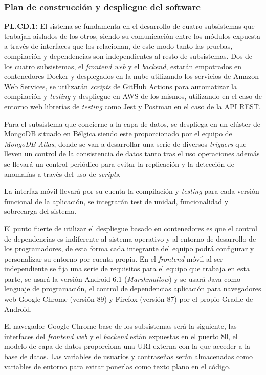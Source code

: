 \documentclass{article}
\begin{document}
\pagebreak
\subsubsection{Plan de construcción y despliegue del software}
 
\textbf{PL.CD.1: }
El sistema se fundamenta en el desarrollo de cuatro subsistemas que trabajan aislados de los otros, siendo su comunicación entre los módulos expuesta a través de interfaces que los relacionan, de este modo tanto las pruebas, compilación y dependencias son independientes al resto de subsistemas.
Dos de los cuatro subsistemas, el \textit{frontend web} y el \textit{backend}, estarán empotrados en contenedores Docker y desplegados en la nube utilizando los servicios de Amazon Web Services, se utilizarán \textit{scripts} de GitHub Actions para automatizar la compilación y \textit{testing} y despliegue en AWS de los mismos, utilizando en el caso de entorno web librerías de \textit{testing} como Jest y Postman en el caso de la API REST.
 
Para el subsistema que concierne a la capa de datos, se despliega en un clúster de MongoDB situado en Bélgica siendo este proporcionado por el equipo de \textit{MongoDB Atlas}, donde se van a desarrollar una serie de diversos \textit{triggers} que lleven un control de la consistencia de datos tanto tras el uso operaciones además se llevará un control periódico para evitar la replicación y la detección de anomalías a través del uso de \textit{scripts}.
 
La interfaz móvil llevará por su cuenta la compilación y \textit{testing} para cada versión funcional de la aplicación, se integrarán test de unidad, funcionalidad y sobrecarga del sistema.
 
El punto fuerte de utilizar el despliegue basado en contenedores es que el control de dependencias es indiferente al sistema operativo y al entorno de desarrollo de los programadores, de esta forma cada integrante del equipo podrá configurar y personalizar su entorno por cuenta propia. En el \textit{frontend} móvil al ser independiente se fija una serie de requisitos para el equipo que trabaja en esta parte, se usará la versión Android 6.1 (\textit{Marshmallow}) y se usará Java como lenguaje de programación, el control de dependencias aplicación para navegadores web Google Chrome (versión 89) y Firefox (versión 87) por el propio Gradle de Android.
 
El navegador Google Chrome  base de los subsistemas será la siguiente, las interfaces del \textit{frontend web} y el \textit{backend} están expuestas en el puerto 80, el modelo de capa de datos proporciona una URI externa con la que acceder a la base de datos. Las variables de usuarios y contraseñas serán almacenadas como variables de entorno para evitar ponerlas como texto plano en el código.
 
\end{document}
